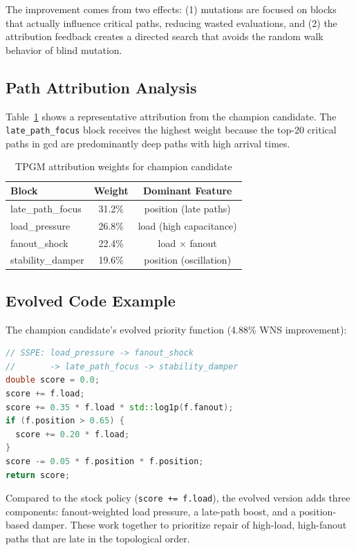 \documentclass[conference]{IEEEtran}
\begin{document}
The improvement comes from two effects: (1) mutations are focused on blocks that actually influence critical paths, reducing wasted evaluations, and (2) the attribution feedback creates a directed search that avoids the random walk behavior of blind mutation.

\subsection{Path Attribution Analysis}

Table~\ref{tab:attribution} shows a representative attribution from the champion candidate. The \texttt{late\_path\_focus} block receives the highest weight because the top-20 critical paths in gcd are predominantly deep paths with high arrival times.

\begin{table}[t]
\centering
\caption{TPGM attribution weights for champion candidate}
\label{tab:attribution}
\begin{tabular}{lcc}
\toprule
\textbf{Block} & \textbf{Weight} & \textbf{Dominant Feature} \\
\midrule
late\_path\_focus & 31.2\% & position (late paths) \\
load\_pressure & 26.8\% & load (high capacitance) \\
fanout\_shock & 22.4\% & load $\times$ fanout \\
stability\_damper & 19.6\% & position (oscillation) \\
\bottomrule
\end{tabular}
\end{table}

\subsection{Evolved Code Example}

The champion candidate's evolved priority function (4.88\% WNS improvement):

\begin{lstlisting}[language=C++, caption={Champion evolved policy}]
// SSPE: load_pressure -> fanout_shock
//       -> late_path_focus -> stability_damper
double score = 0.0;
score += f.load;
score += 0.35 * f.load * std::log1p(f.fanout);
if (f.position > 0.65) {
  score += 0.20 * f.load;
}
score -= 0.05 * f.position * f.position;
return score;
\end{lstlisting}

Compared to the stock policy (\texttt{score += f.load}), the evolved version adds three components: fanout-weighted load pressure, a late-path boost, and a position-based damper. These work together to prioritize repair of high-load, high-fanout paths that are late in the topological order.
\end{document}
